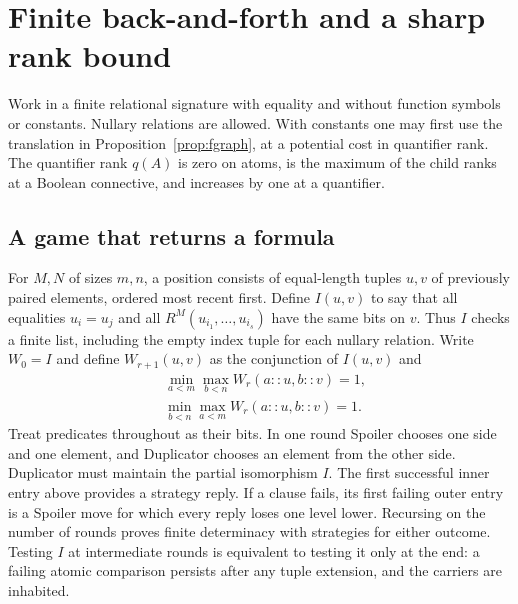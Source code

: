 \section{Finite back-and-forth and a sharp rank bound}\label{sec:ef}
Work in a finite relational signature with equality and without function symbols or constants. Nullary relations are allowed. With constants one may first use the translation in Proposition~\ref{prop:fgraph}, at a potential cost in quantifier rank. The quantifier rank $q(A)$ is zero on atoms, is the maximum of the child ranks at a Boolean connective, and increases by one at a quantifier.

\subsection{A game that returns a formula}
For $M,N$ of sizes $m,n$, a position consists of equal-length tuples $u,v$ of previously paired elements, ordered most recent first. Define $I(u,v)$ to say that all equalities $u_i=u_j$ and all $R^M(u_{i_1},\ldots,u_{i_s})$ have the same bits on $v$. Thus $I$ checks a finite list, including the empty index tuple for each nullary relation. Write $W_0=I$ and define $W_{r+1}(u,v)$ as the conjunction of $I(u,v)$ and
\[
 \begin{split}
 &\min_{a<m}\max_{b<n} W_r(a::u,b::v)=1,\\[-2pt]
 &\min_{b<n}\max_{a<m} W_r(a::u,b::v)=1 .
 \end{split}
\]
Treat predicates throughout as their bits. In one round Spoiler chooses one side and one element, and Duplicator chooses an element from the other side. Duplicator must maintain the partial isomorphism $I$. The first successful inner entry above provides a strategy reply. If a clause fails, its first failing outer entry is a Spoiler move for which every reply loses one level lower. Recursing on the number of rounds proves finite determinacy with strategies for either outcome. Testing $I$ at intermediate rounds is equivalent to testing it only at the end: a failing atomic comparison persists after any tuple extension, and the carriers are inhabited.

